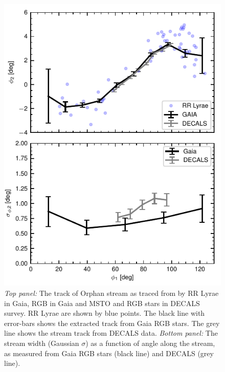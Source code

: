 \documentclass[a4paper,useAMS,usenatbib]{mnras}
\begin{document}
\begin{figure}
  \centering
  \includegraphics{gaia_fit_plot2.pdf}
  \caption[]{{\it Top panel:} The track of Orphan stream as traced from by RR Lyrae in Gaia, RGB in Gaia and MSTO and RGB stars in DECALS survey. RR Lyrae are shown by blue points. The black line with error-bars shows the extracted track from Gaia RGB stars. The grey line shows the stream track from DECALS data. {\it Bottom panel:} The stream width (Gaussian $\sigma$) as a function of angle along the stream, as  measured from Gaia RGB stars (black line) and DECALS (grey line). }
   \label{fig:selection}
\end{figure}
\end{document}
